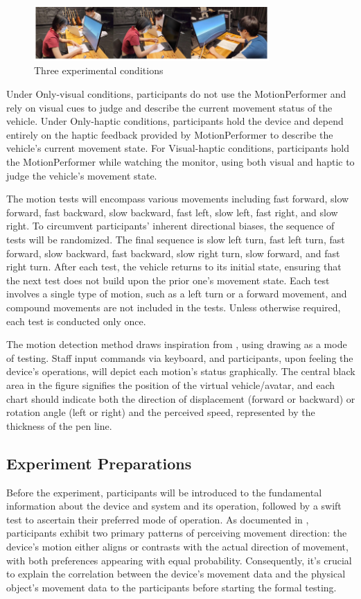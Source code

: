 \begin{figure}[h]
\centering
\includegraphics[width=0.8\textwidth]{A_thesis/figures/036.png}
\caption{Three experimental conditions}
\end{figure}

Under Only-visual conditions, participants do not use the MotionPerformer and rely on visual cues to judge and describe the current movement status of the vehicle. Under Only-haptic conditions, participants hold the device and depend entirely on the haptic feedback provided by MotionPerformer to describe the vehicle's current movement state. For Visual-haptic conditions, participants hold the MotionPerformer while watching the monitor, using both visual and haptic to judge the vehicle's movement state.

The motion tests will encompass various movements including fast forward, slow forward, fast backward, slow backward, fast left, slow left, fast right, and slow right. To circumvent participants' inherent directional biases, the sequence of tests will be randomized. The final sequence is slow left turn, fast left turn, fast forward, slow backward, fast backward, slow right turn, slow forward, and fast right turn. After each test, the vehicle returns to its initial state, ensuring that the next test does not build upon the prior one's movement state. Each test involves a single type of motion, such as a left turn or a forward movement, and compound movements are not included in the tests. Unless otherwise required, each test is conducted only once.

The motion detection method draws inspiration from \cite{paper36}, using drawing as a mode of testing. Staff input commands via keyboard, and participants, upon feeling the device's operations, will depict each motion's status graphically. The central black area in the figure signifies the position of the virtual vehicle/avatar, and each chart should indicate both the direction of displacement (forward or backward) or rotation angle (left or right) and the perceived speed, represented by the thickness of the pen line.

\subsection{Experiment Preparations}
Before the experiment, participants will be introduced to the fundamental information about the device and system and its operation, followed by a swift test to ascertain their preferred mode of operation. As documented in \cite{ref_motion001}, participants exhibit two primary patterns of perceiving movement direction: the device's motion either aligns or contrasts with the actual direction of movement, with both preferences appearing with equal probability. Consequently, it's crucial to explain the correlation between the device's movement data and the physical object's movement data to the participants before starting the formal testing.

